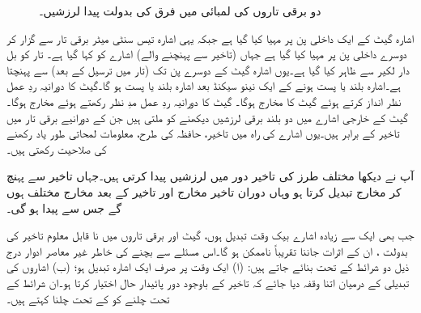 \begin{figure}
\begin{subfigure}{1\textwidth}
\caption{}
\end{subfigure}
\caption{دو برقی تاروں کی لمبائی میں فرق کی بدولت پیدا لرزشیں۔}
\label{شکل_غیر_معاصر_لمبائی_تار_لرزش}
\end{figure}

 اشارہ  گیٹ کے ایک داخلی پن پر مہیا کیا گیا ہے جبکہ یہی اشارہ تیس سنٹی میٹر برقی تار سے گزار کر دوسرے داخلی پن پر مہیا کیا گیا ہے جہاں  (تاخیر سے پہنچنے والے) اشارے کو  کہا گیا ہے۔ تار کو بل دار لکیر سے ظاہر کیا گیا ہے۔یوں اشارہ  گیٹ کے دوسرے پن تک (تار میں ترسیل کے بعد)  سے پہنچتا ہے۔اشارہ  بلند یا پست ہونے کے ایک نینو سیکنڈ بعد اشارہ  بلند یا پست ہو گا۔گیٹ کا دورانیہ ردِ عمل نظر انداز کرتے ہوئے گیٹ کا مخارج  ہوگا۔ گیٹ کا دورانیہ ردِ عمل مدِ نظر رکھتے ہوئے مخارج  ہوگا۔گیٹ کے خارجی اشارے میں دو بلند برقی لرزشیں دیکھنے کو ملتی ہیں جن کے دورانیے برقی تار میں تاخیر کے برابر ہیں۔یوں اشارے کی راہ میں تاخیر، حافظہ کی طرح، معلومات لمحاتی طور یاد رکھنے کی صلاحیت رکھتی ہیں۔

آپ نے دیکھا مختلف طرز کی تاخیر دور میں لرزشیں پیدا کرتی ہیں۔جہاں تاخیر سے پہنچ کر مخارج تبدیل کرتا ہو وہاں دوران تاخیر مخارج اور تاخیر کے بعد مخارج مختلف ہوں گے جس سے  پیدا ہو گی۔

 جب بھی ایک سے زیادہ اشارے بیک وقت تبدیل ہوں، گیٹ اور برقی تاروں میں نا قابل معلوم تاخیر کی بدولت ، ان کے اثرات جاننا تقریباً ناممکن ہو گا۔اس مسئلے سے بچنے کی خاطر غیر معاصر ادوار درج ذیل دو شرائط کے تحت بنائے جاتے ہیں: (ا) ایک وقت پر صرف ایک اشارہ تبدیل ہو؛ (ب) اشاروں کی تبدیلی کے درمیان اتنا وقفہ دیا جائے کہ تاخیر کے باوجود دور پائیدار حال اختیار کرتا ہو۔ان شرائط کے تحت چلنے کو  کے تحت چلنا کہتے ہیں۔

